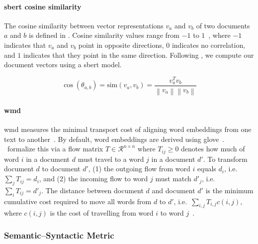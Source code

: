 \paragraph{\acs{sbert} cosine similarity}
The cosine similarity between vector representations $v_a$ and $v_b$ of two documents $a$ and $b$ is defined in . 
Cosine similarity values range from $-1$ to $1$~\citep{thongtan_cosine_sim_19,zhang_bertscore_2020}, where $-1$ indicates that $v_a$ and $v_b$ point in opposite directions, $0$ indicates no correlation, and $1$ indicates that they point in the same direction. 
Following \citet{gohsen_captions_2023}, we compute our document vectors using a \ac{sbert} model.

\begin{equation}
    \cos(\theta_{a,b})=\mathrm{sim}(v_a,v_b)=\frac{v_a^Tv_b}{\left\| v_a \right\|\left\| v_b \right\|}
    \label{eq:cosine_sim}
\end{equation}


\paragraph{\ac{wmd}}
\ac{wmd} measures the minimal transport cost of aligning word embeddings from one text to another~\citep{gohsen_captions_2023}. 
By default, word embeddings are derived using \acs{glove}~\citep{glove_wmd_2014}.
\citet{kusner_wmd_15}\ formalize this via a flow matrix $T \in \mathcal{R}^{n \times n}$ where $T_{ij} \geq 0$ denotes how much of word $i$ in a document $d$ must travel to a word $j$ in a document $d'$.
To transform document $d$ to document $d'$, (1) the outgoing flow from word $i$ equals $d_i$, i.e.\ $\sum_{j}T_{ij}=d_i$, and (2) the incoming flow to word $j$ must match $d'_j$, i.e.\ $\sum_{i}T_{ij}=d'_j$.
The distance between document $d$ and document $d'$ is the minimum cumulative cost required to move all words from $d$ to $d'$, i.e.\ $\sum_{i,j}T_{i,j}c(i,j)$, where $c(i,j)$ is the cost of travelling from word $i$ to word $j$~\citep{kusner_wmd_15}.


\subsubsection{Semantic–Syntactic Metric}

